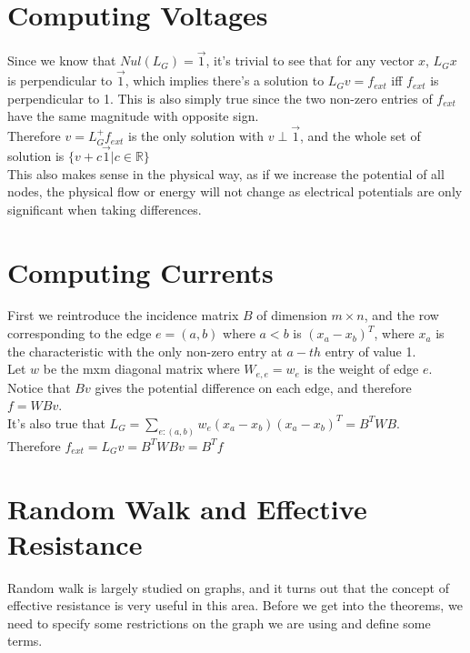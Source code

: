 \documentclass[12pt]{article}
\begin{document}
\section{Computing Voltages}
Since we know that $Nul(L_G) = \vec{1}$, it's trivial to see that for any vector $x$, $L_G x$ is perpendicular to $\vec{1}$, which implies there's a solution to $L_Gv = f_{ext}$ iff $f_{ext}$ is perpendicular to 1. This is also simply true since the two non-zero entries of $f_{ext}$ have the same magnitude with opposite sign.\\
\newline
Therefore $v = L_{G}^+ f_{ext}$ is the only solution with $v \perp \vec{1}$, and the whole set of solution is $\{v + c\vec{1} | c\in \mathbb{R}\}$ \\
\newline
This also makes sense in the physical way, as if we increase the potential of all nodes, the physical flow or energy will not change as electrical potentials are only significant when taking differences.

\section{Computing Currents}
First we reintroduce the incidence matrix $B$ of dimension $m \times n$, and the row corresponding to the edge $e = (a, b)$ where $a < b$ is $(x_a - x_b)^T$, where $x_a$ is the characteristic with the only non-zero entry at $a-th$ entry of value 1.\\
\newline
Let $w$ be the mxm diagonal matrix where $W_{e, e} = w_e$ is the weight of edge $e$.\\
\newline
Notice that $Bv$ gives the potential difference on each edge, and therefore $f = WBv$.\\
\newline
It's also true that $L _ { G } = \sum _ { e : ( a , b ) } w _ { e } \left( x _ { a } - x _ { b } \right) \left( x _ { a } - x _ { b } \right) ^ { T } = B ^ { T } W B$. \\
\newline Therefore $f _ { e x t } = L _ { G } v = B ^ { T } W B v = B ^ { T } f$

\newpage

\section{Random Walk and Effective Resistance}
Random walk is largely studied on graphs, and it turns out that the concept of effective resistance is very useful in this area. Before we get into the theorems, we need to specify some restrictions on the graph we are using and define some terms.
\end{document}
